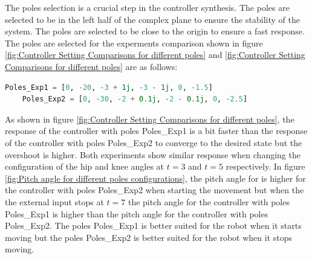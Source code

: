 

The poles selection is a crucial step in the controller synthesis. The poles are selected to be in the left half of the complex plane to ensure the stability of the system. The poles are selected to be close to the origin to ensure a fast response. The poles are selected for the experments comparison shown in figure \ref{fig:Controller Setting Comparisons for different poles} and \ref{fig:Controller Setting Comparisons for different poles} are as follows:
\newpage
\begin{lstlisting}[language=Python, caption=The poles for the experments comparison, label={lst:The poles for the experments comparison}]
	Poles_Exp1 = [0, -20, -3 + 1j, -3 - 1j, 0, -1.5]
	Poles_Exp2 = [0, -30, -2 + 0.1j, -2 - 0.1j, 0, -2.5]
\end{lstlisting}

As shown in figure \ref{fig:Controller Setting Comparisons for different poles}, the response of the controller with poles Poles\_Exp1 is a bit faster than the response of the controller with poles Poles\_Exp2 to converge to the desired state but the overshoot is higher. Both experiments show similar response when changing the configuration of the hip and knee angles at $t=3$ and $t=5$ respectively. In figure \ref{fig:Pitch angle for different poles configurations}, the pitch angle for is higher for the controller with poles Poles\_Exp2 when starting the movement but when the the external input stops at $t=7$ the pitch angle for the controller with poles Poles\_Exp1 is higher than the pitch angle for the controller with poles Poles\_Exp2. The poles Poles\_Exp1 is better suited for the robot when it starts moving but the poles Poles\_Exp2 is better suited for the robot when it stops moving.









	


